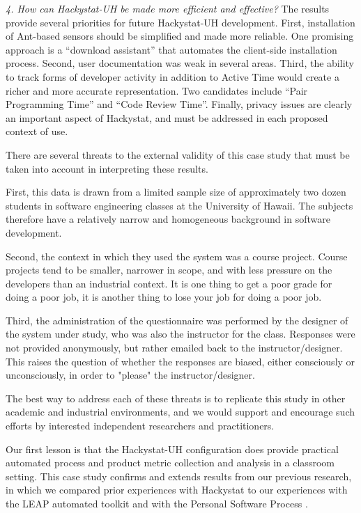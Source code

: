 \documentclass[10pt,twocolumn]{article}
\begin{document}
{\em 4. How can Hackystat-UH be made more efficient and effective?} 
The results provide several priorities for future Hackystat-UH
development. First, installation of Ant-based sensors should be simplified and made
more reliable.  One promising approach is a ``download assistant'' that
automates the client-side installation process. Second, user documentation
was weak in several areas. Third, the ability to track forms of 
developer activity in addition to Active Time would create a richer and more accurate
representation. Two candidates include ``Pair Programming Time'' and ``Code
Review Time''. Finally, privacy issues are clearly an important aspect of
Hackystat, and must be addressed in each proposed context of use. 


\label{sec:limitations}

There are several threats to the external validity of this case study that
must be taken into account in interpreting these results.

First, this data is drawn from a limited sample size of approximately two
dozen students in software engineering classes at the University of Hawaii.
The subjects therefore have a relatively narrow and homogeneous background
in software development.

Second, the context in which they used the system was a course project.
Course projects tend to be smaller, narrower in scope, and with less
pressure on the developers than an industrial context.  It is one thing to
get a poor grade for doing a poor job, it is another thing to lose your job
for doing a poor job.  

Third, the administration of the questionnaire was performed by the
designer of the system under study, who was also the instructor
for the class.  Responses were not provided anonymously, but
rather emailed back to the instructor/designer.  This raises the question
of whether the responses are biased, either consciously or unconsciously,
in order to "please" the instructor/designer.

The best way to address each of these threats is to replicate this study in
other academic and industrial environments, and we would support and
encourage such efforts by interested independent researchers and practitioners.


\label{sec:lessons}

Our first lesson is that the Hackystat-UH configuration does
provide practical automated process and product metric collection and analysis in a
classroom setting. This case study confirms and extends results from our
previous research, in which we compared prior experiences with Hackystat to
our experiences with the LEAP automated toolkit and with the Personal
Software Process \cite{csdl2-02-07}.
\end{document}
